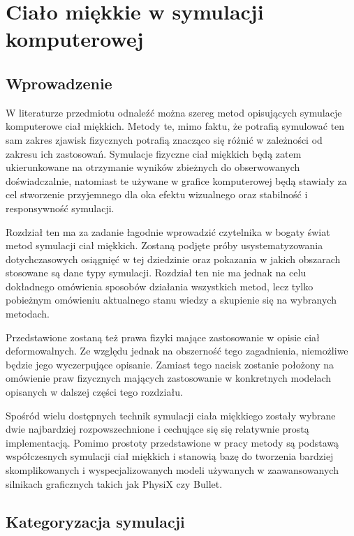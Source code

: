\chapter{Ciało miękkie w symulacji komputerowej}

\section{Wprowadzenie}

W literaturze przedmiotu odnaleźć można szereg metod opisujących symulacje komputerowe ciał
miękkich. Metody te, mimo faktu, że potrafią symulować ten sam zakres zjawisk
fizycznych potrafią znacząco się różnić w zależności od zakresu ich zastosowań.
Symulacje fizyczne ciał miękkich będą zatem ukierunkowane na otrzymanie wyników
zbieżnych do obserwowanych doświadczalnie, natomiast te używane w grafice
komputerowej będą stawiały za cel stworzenie przyjemnego dla oka efektu
wizualnego oraz stabilność i responsywność symulacji.

Rozdział ten ma za zadanie łagodnie wprowadzić czytelnika w bogaty świat metod symulacji
ciał miękkich. Zostaną podjęte próby usystematyzowania dotychczasowych
osiągnięć w tej dziedzinie oraz pokazania w jakich obszarach stosowane są
dane typy symulacji. Rozdział ten nie ma jednak na celu dokładnego omówienia sposobów 
działania wszystkich metod, lecz tylko pobieżnym omówieniu aktualnego stanu
wiedzy a skupienie się na wybranych metodach.

Przedstawione zostaną też prawa fizyki mające zastosowanie w opisie ciał deformowalnych. Ze
względu jednak na obszerność tego zagadnienia, 
niemożliwe będzie jego wyczerpujące opisanie. Zamiast tego nacisk
zostanie położony na omówienie praw fizycznych mających zastosowanie w
konkretnych modelach opisanych w dalszej części tego rozdziału.

Spośród wielu dostępnych technik symulacji ciała miękkiego zostały wybrane
dwie najbardziej rozpowszechnione i cechujące się się
relatywnie prostą implementacją. Pomimo prostoty przedstawione w pracy
metody są podstawą współczesnych symulacji ciał
miękkich i stanowią bazę do tworzenia bardziej skomplikowanych i 
wyspecjalizowanych modeli używanych w zaawansowanych silnikach graficznych
takich jak PhysiX czy Bullet.

\section{Kategoryzacja symulacji}


